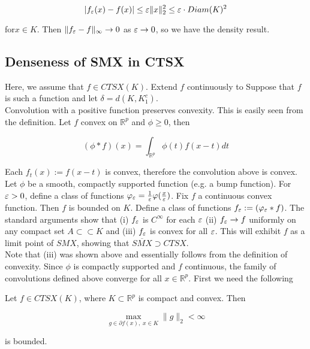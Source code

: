 \documentclass[11pt,reqno]{amsart}
\numberwithin{equation}{section}
\newcommand{\mr}{\mathbb{R}}
\newcommand{\pa}{\partial}
\begin{document}
\[
|f_{\varepsilon}(x) - f(x)| \leq \varepsilon \|x\|_2^2 \leq \varepsilon \cdot Diam(K)^2
\]

for$x \in K$. Then $\|f_{\varepsilon} - f\|_{\infty} \rightarrow 0$ as $\varepsilon \rightarrow 0$, so we have the density result. 

\subsection{Denseness of SMX in CTSX} Here, we assume that $f \in CTSX(K)$. Extend $f$ continuously to Suppose that $f$ is such a function and let $\delta = d(K, K_1^c)$. \\

Convolution with a positive function preserves convexity. This is easily seen from the definition. Let $f$ convex on $\mr^p$ and $\phi \geq 0$, then 

\[
(\phi \ast f)(x) = \int_{\mr^p} \phi(t) f(x - t) dt 
\]

Each $f_t(x) := f(x -t)$ is convex, therefore the convolution above is convex. \\

Let $\phi$ be a smooth, compactly supported function (e.g. a bump function). For $\varepsilon > 0$, define a class of functions $\varphi_{\varepsilon} = \frac{1}{\varepsilon} \varphi(\frac{x}{\varepsilon})$. Fix $f$ a continuous convex function. Then $f$ is bounded on $K$. Define a class of functions $f_{\varepsilon} := (\varphi_{\varepsilon} \ast f)$. The standard arguments show that (i) $f_{\varepsilon}$ is $C^{\infty}$ for each $\varepsilon$ (ii) $f_{\varepsilon} \rightarrow f$ uniformly on any compact set $A \subset \subset K$ and (iii) $f_{\varepsilon}$ is convex for all $\varepsilon$. This will exhibit $f$ as a limit point of $SMX$, showing that $\overline{SMX} \supset CTSX$. \\

Note that (iii) was shown above and essentially follows from the definition of convexity. Since $\phi$ is compactly supported and $f$ continuous, the family of convolutions defined above converge for all $x \in \mr^p$. First we need the following 

\begin{lemma} \label{cts-convex-grad} 
Let $f \in CTSX(K)$, where $K \subset \mr^p$ is compact and convex. Then

\begin{equation} \label{grad-set}
\underset{g \in \pa f(x), \; x \in K}{ \max} \|g\|_2  < \infty 
\end{equation}

is bounded. 
\end{lemma}
\end{document}
